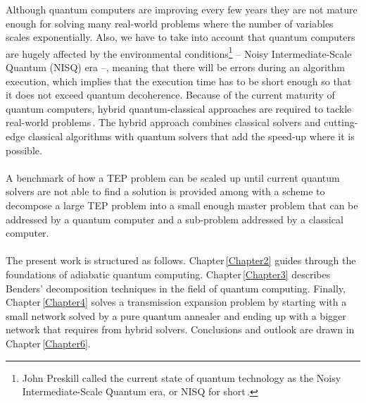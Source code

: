 %
%
Although quantum computers are improving every few years they are not mature enough for solving many real-world problems where the number of variables scales exponentially. Also, we have to take into account that quantum computers are hugely affected by the environmental conditions\footnote{John Preskill called the current state of quantum technology as the Noisy Intermediate-Scale Quantum era, or NISQ for short\,\cite{Preskill2018}.} -- Noisy Intermediate-Scale Quantum (NISQ) era --, meaning that there will be errors during an algorithm execution, which implies that the execution time has to be short enough so that it does not exceed quantum decoherence. Because of the current maturity of quantum computers, hybrid quantum-classical approaches are required to tackle real-world problems\,\cite{Callison2022HybridBeyond}. The hybrid approach combines classical solvers and cutting-edge classical algorithms with quantum solvers that add the speed-up where it is possible.\\\\
A benchmark of how a TEP problem can be scaled up until current quantum solvers are not able to find a solution is provided among with a scheme to decompose a large TEP problem into a small enough master problem that can be addressed by a quantum computer and a sub-problem addressed by a classical computer. \\\\
%
The present work is structured as follows. Chapter\,\ref{Chapter2} guides through the foundations of adiabatic quantum computing. Chapter\,\ref{Chapter3} describes Benders' decomposition techniques in the field of quantum computing. Finally, Chapter\,\ref{Chapter4} solves a transmission expansion problem by starting with a small network solved by a pure quantum annealer and ending up with a bigger network that requires from hybrid solvers. Conclusions and outlook are drawn in Chapter\,\ref{Chapter6}.
